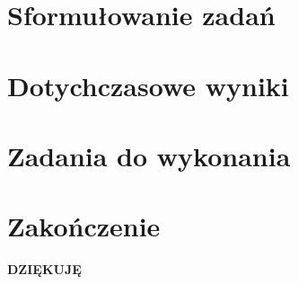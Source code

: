 \documentclass[aspectratio=169,11pt]{beamer}
\let\oldheadcommand\headcommand
\newcommand{\resumenavigation}{\addtocontents{nav}{\string\let\string\headcommand\string\oldheadcommand}}
\begin{document}
\section{Sformułowanie zadań}


\section{Dotychczasowe wyniki}


\section{Zadania do wykonania}


\section{Zakończenie}
\begin{frame}
	\begin{center}
	\LARGE{\textbf{DZIĘKUJĘ}}
	\end{center}
\end{frame}


\end{document}
